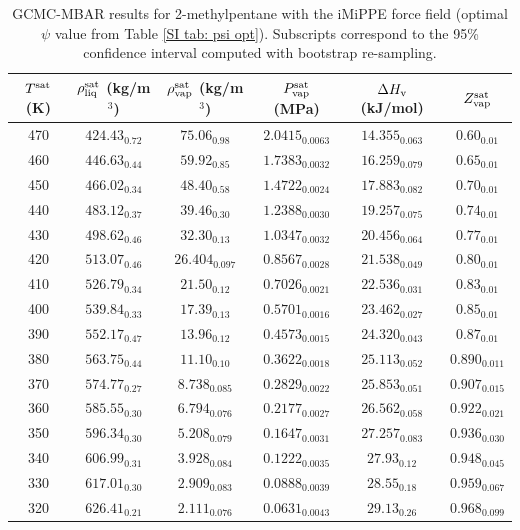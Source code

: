 \documentclass[journal=jctc,manuscript=article]{achemso}
\begin{document}
\begin{table}[htb!]
	\caption{GCMC-MBAR results for 2-methylpentane with the iMiPPE force field (optimal $\psi$ value from Table \ref{SI tab: psi opt}). Subscripts correspond to the 95\% confidence interval computed with bootstrap re-sampling.}
	\begin{center}
		\begin{tabular}{|c|c|c|c|c|c|}
			\hline
			$T^{\rm sat}$ (K) & $\rho_{\rm liq}^{\rm sat}$ (kg/m$^3$) & $\rho_{\rm vap}^{\rm sat}$ (kg/m$^3$) & $P_{\rm vap}^{\rm sat}$ (MPa) & $\Delta H_{\rm v}$ (kJ/mol) & $Z_{\rm vap}^{\rm sat}$ \\ \hline
			470 & $424.43_{0.72}$ & $75.06_{0.98}$ & $2.0415_{0.0063}$ & $14.355_{0.063}$ & $0.60_{0.01}$ \\
			460 & $446.63_{0.44}$ & $59.92_{0.85}$ & $1.7383_{0.0032}$ & $16.259_{0.079}$ & $0.65_{0.01}$ \\
			450 & $466.02_{0.34}$ & $48.40_{0.58}$ & $1.4722_{0.0024}$ & $17.883_{0.082}$ & $0.70_{0.01}$ \\
			440 & $483.12_{0.37}$ & $39.46_{0.30}$ & $1.2388_{0.0030}$ & $19.257_{0.075}$ & $0.74_{0.01}$ \\
			430 & $498.62_{0.46}$ & $32.30_{0.13}$ & $1.0347_{0.0032}$ & $20.456_{0.064}$ & $0.77_{0.01}$ \\
			420 & $513.07_{0.46}$ & $26.404_{0.097}$ & $0.8567_{0.0028}$ & $21.538_{0.049}$ & $0.80_{0.01}$ \\
			410 & $526.79_{0.34}$ & $21.50_{0.12}$ & $0.7026_{0.0021}$ & $22.536_{0.031}$ & $0.83_{0.01}$ \\
			400 & $539.84_{0.33}$ & $17.39_{0.13}$ & $0.5701_{0.0016}$ & $23.462_{0.027}$ & $0.85_{0.01}$ \\
			390 & $552.17_{0.47}$ & $13.96_{0.12}$ & $0.4573_{0.0015}$ & $24.320_{0.043}$ & $0.87_{0.01}$ \\
			380 & $563.75_{0.44}$ & $11.10_{0.10}$ & $0.3622_{0.0018}$ & $25.113_{0.052}$ & $0.890_{0.011}$ \\
			370 & $574.77_{0.27}$ & $8.738_{0.085}$ & $0.2829_{0.0022}$ & $25.853_{0.051}$ & $0.907_{0.015}$ \\
			360 & $585.55_{0.30}$ & $6.794_{0.076}$ & $0.2177_{0.0027}$ & $26.562_{0.058}$ & $0.922_{0.021}$ \\
			350 & $596.34_{0.30}$ & $5.208_{0.079}$ & $0.1647_{0.0031}$ & $27.257_{0.083}$ & $0.936_{0.030}$ \\
			340 & $606.99_{0.31}$ & $3.928_{0.084}$ & $0.1222_{0.0035}$ & $27.93_{0.12}$ & $0.948_{0.045}$ \\
			330 & $617.01_{0.30}$ & $2.909_{0.083}$ & $0.0888_{0.0039}$ & $28.55_{0.18}$ & $0.959_{0.067}$ \\
			320 & $626.41_{0.21}$ & $2.111_{0.076}$ & $0.0631_{0.0043}$ & $29.13_{0.26}$ & $0.968_{0.099}$ \\
			\hline
		\end{tabular}
	\end{center}
\end{table}
\end{document}
